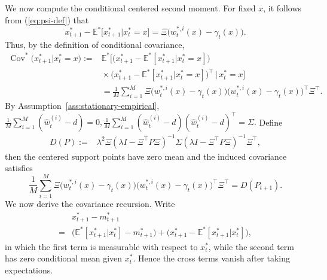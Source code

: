 \documentclass[10pt,journal,twoside]{IEEEtran}
\theoremstyle{definition}
\theoremstyle{remark}
\begin{document}
{We now compute the conditional centered second moment.}
For fixed \(x\), it follows from  (\ref{eq:psi-def}) that
\[
x_{t+1}^*-\mathbb E^*
		\big[
		x_{t+1}^*
		\big| x_t^*=x
		\big] =
	\Xi
	\big(
	w_t^{*,i}(x)-\gamma_t(x)
	\big).
\]
Thus, by the definition of conditional covariance,
\begin{equation}
	\begin{aligned}
		\operatorname{Cov}^{*}
		\big(
		x_{t+1}^*
		\big|
		x_t^*=x
		\big) 
		:=&
		\mathbb E^*
		\Big[
		\big(
		x_{t+1}^*
		-
		\mathbb E^*
		[
		x_{t+1}^*
		\big|
		x_t^*=x
		]
		\big) \\
		&\!\!\!\!\!\!\!\!\!\!\!\!\!\!\!\!\!\!\!\!\!\!\!\!\!\!\!\!\!\!\!\!\!\times
		\big(
		x_{t+1}^*
		-
		\mathbb E^*
		[
		x_{t+1}^*
		\big|
		x_t^*=x
		]
		\big)^\top
		\,\Big|\,
		x_t^*=x
		\Big] \\
		&\!\!\!\!\!\!\!\!\!\!\!\!\!\!\!\!\!\!\!\!\!\!\!\!\!\!\!\!\!\!\!\!\!\!\!\!\!\!\!\!\!\!\!\!\!\!\!\!\!\!\!\!\!\!\!\!\!\!\!\!\!\!=
		\frac1M\sum_{i=1}^M
		\Xi
		\big(w_t^{*,i}(x)-\gamma_t(x)\big)\big(w_t^{*,i}(x)-\gamma_t(x)\big)^\top
		\Xi^\top .
	\end{aligned}
	\label{eq:eta-conditional-cov}
\end{equation}
By Assumption~\ref{ass:stationary-empirical},
\(
\frac1M\sum_{i=1}^M(
\widehat w_t^{(i)}-d)=0,
\frac1M\sum_{i=1}^M
(\widehat w_t^{(i)}-d)(\widehat w_t^{(i)}-d)^\top
=
\Sigma .
\)
Define
\begin{align}\label{eq:DP}
	D(P)
	:={}&
	\lambda^2
	\Xi
	(\lambda I-\Xi^\top P\Xi)^{-1}
	\Sigma 
	(\lambda I-\Xi^\top P\Xi)^{-1}
	\Xi^\top,
\end{align}
then the centered support points have zero mean and the induced covariance satisfies
\begingroup
$$
\frac1M\sum_{i=1}^M
		\Xi\big(w_t^{*,i}(x)-\gamma_t(x)\big)
		\big(w_t^{*,i}(x)-\gamma_t(x)\big)^\top\Xi^\top=D(P_{t+1}).
$$
We now derive the covariance recursion.
Write
\begin{equation*}
	\begin{aligned}
		&x_{t+1}^*-m_{t+1}^*\\
		=&
		\Big(
		\mathbb E^*
		[
		x_{t+1}^*
		\big|
		x_t^*
		]
		-
		m_{t+1}^*
		\Big) +
		\Big(
		x_{t+1}^*
		-
		\mathbb E^*
		[
		x_{t+1}^*
		\big|
		x_t^*
		]
		\Big),
	\end{aligned}
\end{equation*}
in which the first term is measurable with respect to \(x_t^*\), while the second term has zero conditional mean given \(x_t^*\). Hence the cross terms vanish after taking expectations.
\end{document}
